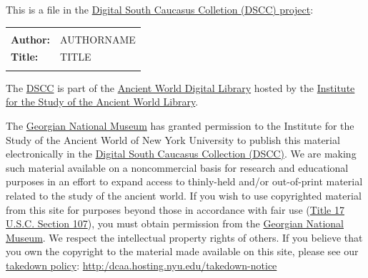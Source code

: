 \documentclass[final, 12pt]{report}
\newcounter{nopage}
\newenvironment{nopage}
	{\clearpage\stepcounter{nopage}%
		\renewcommand{\thepage}{}%
		\thispagestyle{empty}}
	{\clearpage\addtocounter{page}{0}}
\begin{document}
	\begin{nopage}

	This is a file in the 
	\href{http://dcaa.hosting.nyu.edu/}{Digital South Caucasus Colletion (DSCC) project}:\vspace{24pt}
	
	\begin{tabular}{lp{6in}}
		\hline
		\\
		\textbf{Author:}				&	{{AUTHORNAME}}		\\
		\textbf{Title:}				&	{{TITLE}}			\\
		\\
		\hline
	\end{tabular}
	
	\vspace{24pt}
	
	The 
	\href{http://dcaa.hosting.nyu.edu/dscc}{DSCC}
	is part of the 
	\href{http://dlib.nyu.edu/ancientworld/}{Ancient World Digital Library}
	hosted by the 
	\href{https://isaw.nyu.edu/library}{Institute for the Study of the Ancient World Library}.
	
	\vspace{24pt}
	
	The \href{https://www.aejm.org/members/georgian-national-museum/}{Georgian National Museum} has granted permission to the Institute for the Study of the Ancient World of New York University to publish this material electronically in the \href{http://dcaa.hosting.nyu.edu/dscc/}{Digital South Caucasus Collection (DSCC)}.	
	We are making such material available on a noncommercial basis  for research and educational purposes
		in an effort to expand access to thinly-held and/or out-of-print  material related to the study of the ancient world.
	If you wish to use copyrighted material from this site  for purposes beyond those in accordance with fair use 
		(\href{https://www.copyright.gov/title17/92chap1.html}{Title 17 U.S.C. Section 107}),
		you must obtain permission from the 
		\href{https://www.aejm.org/members/georgian-national-museum/}{Georgian National Museum}. 
	We respect the intellectual property rights of others.
	If you believe that you own the copyright to the material made available on this site, 
		please see our \href{http:/dcaa.hosting.nyu.edu/takedown-notice}{takedown policy}: 
		\href{http:/dcaa.hosting.nyu.edu/takedown-notice}{http:/dcaa.hosting.nyu.edu/takedown-notice}


\end{nopage}
\end{document}
